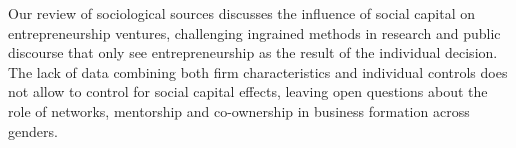 Our review of sociological sources discusses the influence of social capital on entrepreneurship ventures, challenging ingrained methods in research and public discourse that only see entrepreneurship as the result of the individual decision. The lack of data combining both firm characteristics and individual controls does not allow to control for social capital effects, leaving open questions about the role of networks, mentorship and co-ownership in business formation across genders.














